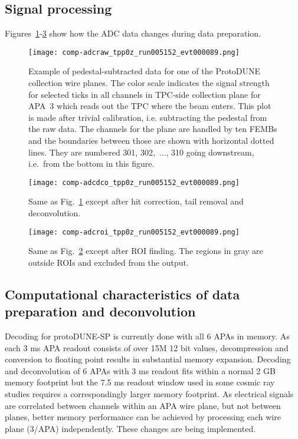 \subsection{Signal processing}
Figures~\ref{fig:ch-exec-comp-chtraw}-\ref{fig:ch-exec-comp-chtroi} show how the ADC data changes during data
preparation.

\begin{figure}[t]
\texttt{[image: comp-adcraw\_tpp0z\_run005152\_evt000089.png]}
\caption{
Example of pedestal-subtracted data for one of the ProtoDUNE collection wire planes.
The color scale indicates the signal strength for selected ticks in all channels
in TPC-side collection plane for APA~3 which reads out the TPC where the beam enters.
This plot is made after trivial calibration, i.e. subtracting the pedestal from the raw data.
The channels for the plane are handled by ten FEMBs and the boundaries between those
are shown with horizontal dotted lines. They are numbered 301, 302,~..., 310 going
downstream, i.e.\ from the bottom in this figure.
}
\label{fig:ch-exec-comp-chtraw}
\end{figure}




\begin{figure}[t]
  \texttt{[image: comp-adcdco\_tpp0z\_run005152\_evt000089.png]}
\caption{
Same as Fig.~\ref{fig:ch-exec-comp-chtraw} except after hit correction, tail removal and deconvolution.
}
\label{fig:ch-exec-comp-chtdco}
\end{figure}

\begin{figure}[t]
  \texttt{[image: comp-adcroi\_tpp0z\_run005152\_evt000089.png]}
\caption{
Same as Fig.~\ref{fig:ch-exec-comp-chtdco} except after ROI finding. The regions in gray are
outside ROIs and excluded from the output.
}
\label{fig:ch-exec-comp-chtroi}
\end{figure}


\subsection{Computational characteristics of data preparation and deconvolution }
Decoding for protoDUNE-SP is currently done with all 6 APAs in memory. As each 3 ms APA readout consists of over 15M 12 bit values, decompression and conversion to floating point results in substantial memory expansion.  Decoding and deconvolution of 6 APAs with 3 ms readout fits within a normal 2 GB memory footprint but the 7.5 ms readout window used in some cosmic ray studies requires a correspondingly larger memory footprint. As electrical signals are correlated between channels within an APA wire plane, but not between planes, better memory performance can be achieved by processing each wire plane (3/APA) independently. These changes are being implemented.

